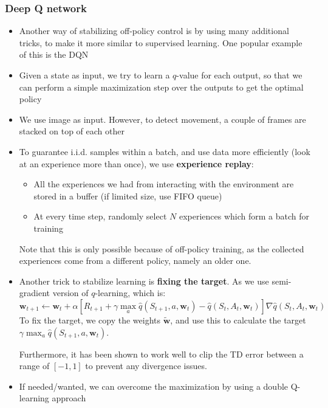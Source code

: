 \subsubsection{Deep Q network}
\begin{itemize}
	\item Another way of stabilizing off-policy control is by using many additional tricks, to make it more similar to supervised learning. One popular example of this is the DQN
	\item Given a state as input, we try to learn a $q$-value for each output, so that we can perform a simple maximization step over the outputs to get the optimal policy
	\item We use image as input. However, to detect movement, a couple of frames are stacked on top of each other
	\item To guarantee i.i.d. samples within a batch, and use data more efficiently (look at an experience more than once), we use \textbf{experience replay}:
	\begin{itemize}
		\item All the experiences we had from interacting with the environment are stored in a buffer (if limited size, use FIFO queue)
		\item At every time step, randomly select $N$ experiences which form a batch for training
	\end{itemize}
	Note that this is only possible because of off-policy training, as the collected experiences come from a different policy, namely an older one.
	\item Another trick to stabilize learning is \textbf{fixing the target}. As we use semi-gradient version of $q$-learning, which is:
	$$\bm{w}_{t+1}\leftarrow \bm{w}_t + \alpha \left[R_{t+1}+\gamma\max_a \hat{q}(S_{t+1}, a, \bm{w}_t) - \hat{q}(S_t, A_t, \bm{w}_t)\right]\nabla \hat{q}(S_t, A_t, \bm{w}_t)$$
	To fix the target, we copy the weights $\tilde{\bm{w}}$, and use this to calculate the target $\gamma\max_a \hat{q}(S_{t+1}, a, \bm{w}_t)$.
	
	Furthermore, it has been shown to work well to clip the TD error between a range of $[-1,1]$ to prevent any divergence issues. 
	\item If needed/wanted, we can overcome the maximization by using a double Q-learning approach
\end{itemize}





